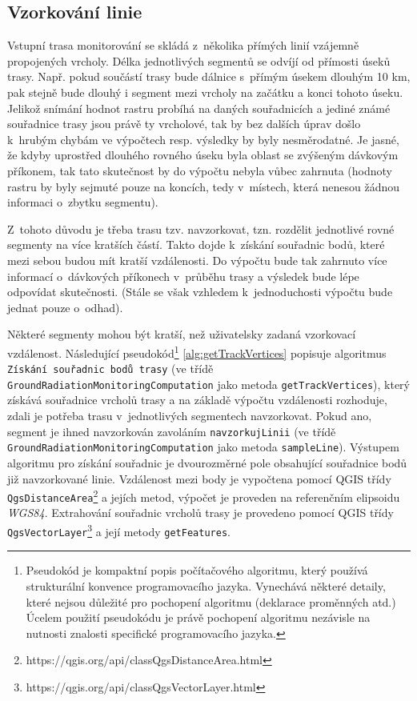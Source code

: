 \subsection{Vzorkování linie}
\label{subsec:vzorkovaniLinie} Vstupní trasa monitorování se skládá
z~několika přímých linií vzájemně propojených vrcholy. Délka
jednotlivých segmentů se odvíjí od přímosti úseků trasy. Např. pokud
součástí trasy bude dálnice s~přímým úsekem dlouhým 10 km, pak stejně
bude dlouhý i segment mezi vrcholy na začátku a konci tohoto
úseku. Jelikož snímání hodnot rastru probíhá na daných souřadnicích a
jediné známé souřadnice trasy jsou právě ty vrcholové, tak by bez
dalších úprav došlo k~hrubým chybám ve výpočtech resp. výsledky by
byly nesměrodatné. Je jasné, že kdyby uprostřed dlouhého rovného úseku
byla oblast se zvýšeným dávkovým příkonem, tak tato skutečnost by do
výpočtu nebyla vůbec zahrnuta (hodnoty rastru by byly sejmuté pouze na
koncích, tedy v~místech, která nenesou žádnou informaci o~zbytku
segmentu).

Z~tohoto důvodu je třeba trasu tzv. navzorkovat, tzn. rozdělit
jednotlivé rovné segmenty na více kratších částí. Takto dojde
k~získání souřadnic bodů, které mezi sebou budou mít kratší
vzdálenosti. Do výpočtu bude tak zahrnuto více informací o~dávkových
příkonech v~průběhu trasy a výsledek bude lépe odpovídat
skutečnosti. (Stále se však vzhledem k~jednoduchosti výpočtu bude
jednat pouze o~odhad).

Některé segmenty mohou být kratší, než uživatelsky zadaná vzorkovací
vzdálenost. Následující pseudokód\footnote{Pseudokód je kompaktní
popis počítačového algoritmu, který používá strukturální konvence
programovacího jazyka. Vynechává některé detaily, které nejsou
důležité pro pochopení algoritmu (deklarace proměnných atd.) Úcelem
použití pseudokódu je právě pochopení algoritmu nezávisle na nutnosti
znalosti specifické programovacího jazyka.\cite{pseudocode}}
\ref{alg:getTrackVertices} popisuje algoritmus \texttt{Získání
souřadnic bodů trasy} (ve třídě
\texttt{GroundRadiationMonitoringComputation} jako metoda
\texttt{getTrackVertices}), který získává souřadnice vrcholů trasy a
na základě výpočtu vzdálenosti rozhoduje, zdali je potřeba trasu
v~jednotlivých segmentech navzorkovat. Pokud ano, segment je ihned
navzorkován zavoláním \texttt{navzorkujLinii} (ve třídě
\texttt{GroundRadiationMonitoringComputation} jako metoda
\texttt{sampleLine}). Výstupem algoritmu pro získání souřadnic je
dvourozměrné pole obsahující souřadnice bodů již navzorkované
linie. Vzdálenost mezi body je vypočtena pomocí QGIS třídy
\texttt{QgsDistanceArea}\footnote{https://qgis.org/api/classQgsDistanceArea.html}
a jejích metod, výpočet je proveden na referenčním elipsoidu
\textit{WGS84}. Extrahování souřadnic vrcholů trasy je provedeno
pomocí QGIS třídy
\texttt{QgsVectorLayer}\footnote{https://qgis.org/api/classQgsVectorLayer.html}
a její metody \texttt{getFeatures}.

